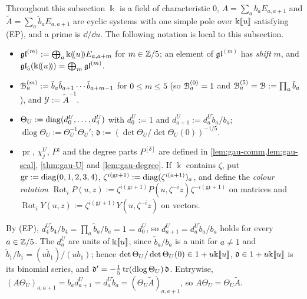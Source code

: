 Throughout this subsection $\Bbbk$ is a field of characteristic $0$, $A=\sum_ab_aE_{a,a+1}$ and $\tilde A=\sum_a\tilde b_aE_{a,a+1}$ are cyclic systems with one simple pole over $\Bbbk[\![ u ]\!]$ satisfying (EP), and a prime is $\dd/\dd u$. The following notation is local to this subsection.
\begin{itemize}
\item $\mathfrak{gl}^{(m)}:=\bigoplus_a\Bbbk(\!(u)\!)E_{a,a+m}$ for $m\in\mathbb{Z}/5$; an element of $\mathfrak{gl}^{(m)}$ has \emph{shift} $m$, and $\mathfrak{gl}_5(\Bbbk(\!(u)\!))=\bigoplus_m\mathfrak{gl}^{(m)}$.
\item $\mathcal{B}^{(m)}_a:=\tilde b_a\tilde b_{a+1}\cdots\tilde b_{a+m-1}$ for $0\leq m\leq5$ (so $\mathcal{B}^{(0)}_a=1$ and $\mathcal{B}^{(5)}_a=\mathcal{B}:=\prod_a\tilde b_a$), and $\mathcal Y:=\tilde A^{-1}$.
\item $\Theta_U:=\operatorname{diag}(d^U_0,\dots,d^U_4)$ with $d^U_0:=1$ and $d^U_{a+1}:=d^U_a\tilde b_a/b_a$; $\operatorname{dlog}\Theta_U:=\Theta_U^{-1}\Theta_U'$; $\mathfrak d:=(\det\Theta_U/\det\Theta_U(0))^{-1/5}$.
\item $\operatorname{pr}$, $\chi^U_j$, $P^\natural$ and the degree parts $P^{[\delta]}$ are defined in \cref{lem:gau-comm,lem:gau-scal}, \cref{thm:gau-U} and \cref{lem:gau-degree}. If $\Bbbk$ contains $\zeta$, put $\mathrm{gr}:=\operatorname{diag}(0,1,2,3,4)$, $\zeta^{i(\mathrm{gr}+1)}:=\operatorname{diag}(\zeta^{i(a+1)})_a$, and define the \emph{colour rotation} $\operatorname{Rot}_iP(u,z):=\zeta^{i(\mathrm{gr}+1)}P(u,\zeta^{-i}z)\zeta^{-i(\mathrm{gr}+1)}$ on matrices and $\operatorname{Rot}_iY(u,z):=\zeta^{i(\mathrm{gr}+1)}Y(u,\zeta^{-i}z)$ on vectors.
\end{itemize}
By (EP), $d^U_4\tilde b_4/b_4=\prod_a\tilde b_a/b_a=1=d^U_0$, so $d^U_{a+1}=d^U_a\tilde b_a/b_a$ holds for every $a\in\mathbb{Z}/5$. The $d^U_a$ are units of $\Bbbk[\![ u ]\!]$, since $\tilde b_a/b_a$ is a unit for $a\neq1$ and $\tilde b_1/b_1=(u\tilde b_1)/(ub_1)$; hence $\det\Theta_U/\det\Theta_U(0)\in1+u\Bbbk[\![ u ]\!]$, $\mathfrak d\in1+u\Bbbk[\![ u ]\!]$ is its binomial series, and $\mathfrak d'=-\frac15\operatorname{tr}(\operatorname{dlog}\Theta_U)\,\mathfrak d$. Entrywise, $(A\Theta_U)_{a,a+1}=b_ad^U_{a+1}=d^U_a\tilde b_a=(\Theta_U\tilde A)_{a,a+1}$, so $A\Theta_U=\Theta_U\tilde A$.

